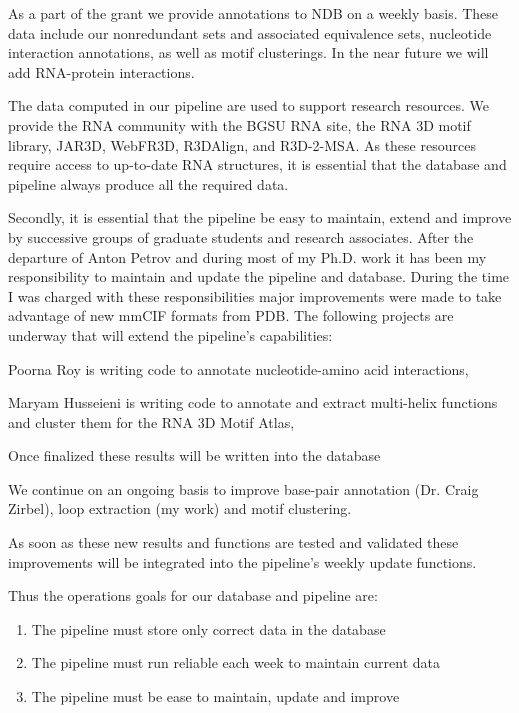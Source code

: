 As a part of the grant we provide annotations to NDB on a weekly basis. These
data include our nonredundant sets and associated equivalence sets, nucleotide
interaction annotations, as well as motif clusterings. In the near future we
will add RNA-protein interactions.

The data computed in our pipeline are used to support research resources. We
provide the RNA community with the BGSU RNA site, the RNA 3D motif library,
JAR3D, WebFR3D, R3DAlign, and R3D-2-MSA. As these resources require access to
up-to-date RNA structures, it is essential that the database and pipeline always
produce all the required data.

Secondly, it is essential that the pipeline be easy to maintain, extend and
improve by successive groups of graduate students and research associates. After
the departure of Anton Petrov and during most of my Ph.D. work it has been my
responsibility to maintain and update the pipeline and database. During the time
I was charged with these responsibilities major improvements were made to take
advantage of new mmCIF formats from PDB. The following projects are underway
that will extend the pipeline's capabilities: 
\begin{enumerate*}
        \item Poorna Roy is writing code to annotate nucleotide-amino acid
                interactions, 
        \item Maryam Husseieni is writing code to annotate and extract
                multi-helix functions and cluster them for the RNA 3D Motif
                Atlas, 
        \item Once finalized these results will be written into the database 
        \item We continue on an ongoing basis to improve base-pair annotation
                (Dr. Craig Zirbel), loop extraction (my work) and motif
                clustering.
\end{enumerate*} 
As soon as these new results and functions are tested and validated these
improvements will be integrated into the pipeline's weekly update functions.

Thus the operations goals for our database and pipeline are:
\begin{enumerate}
        \item The pipeline must store only correct data in the database
        \item The pipeline must run reliable each week to maintain current data
        \item The pipeline must be ease to maintain, update and improve
\end{enumerate}

